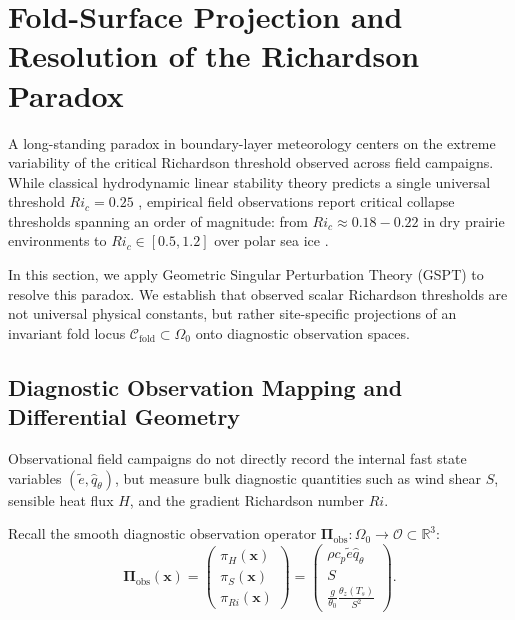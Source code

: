 \section{Fold-Surface Projection and Resolution of the Richardson Paradox}

A long-standing paradox in boundary-layer meteorology centers on the extreme variability of the critical Richardson threshold observed across field campaigns. While classical hydrodynamic linear stability theory predicts a single universal threshold $Ri_c = 0.25$ \citep{Miles1961, Howard1961}, empirical field observations report critical collapse thresholds spanning an order of magnitude: from $Ri_c \approx 0.18 - 0.22$ in dry prairie environments \citep{Poulos2002CASES99} to $Ri_c \in [0.5, 1.2]$ over polar sea ice \citep{Uttal2002SHEBA, Grachev2007, Zilitinkevich2007}.

In this section, we apply Geometric Singular Perturbation Theory (GSPT) to resolve this paradox. We establish that observed scalar Richardson thresholds are not universal physical constants, but rather site-specific projections of an invariant fold locus $\mathcal{C}_{\mathrm{fold}} \subset \Omega_0$ onto diagnostic observation spaces.

\subsection{Diagnostic Observation Mapping and Differential Geometry}

Observational field campaigns do not directly record the internal fast state variables $(\tilde e, \hat q_\theta)$, but measure bulk diagnostic quantities such as wind shear $S$, sensible heat flux $H$, and the gradient Richardson number $Ri$.

Recall the smooth diagnostic observation operator $\boldsymbol{\Pi}_{\mathrm{obs}} : \Omega_0 \to \mathcal{O} \subset \mathbb{R}^3$:
\begin{equation}
\boldsymbol{\Pi}_{\mathrm{obs}}(\mathbf{x}) =
\begin{pmatrix}
\pi_H(\mathbf{x}) \\[4pt]
\pi_S(\mathbf{x}) \\[4pt]
\pi_{Ri}(\mathbf{x})
\end{pmatrix}
=
\begin{pmatrix}
\rho c_p \tilde e \hat q_\theta \\[4pt]
S \\[4pt]
\frac{g}{\theta_0} \frac{\theta_z(T_s)}{S^2}
\end{pmatrix}.
\end{equation}

